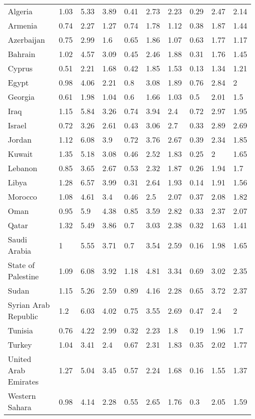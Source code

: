 \begin{longtable}[t]{llllllllll}
Algeria & 1.03 & 5.33 & 3.89 & 0.41 & 2.73 & 2.23 & 0.29 & 2.47 & 2.14\\
Armenia & 0.74 & 2.27 & 1.27 & 0.74 & 1.78 & 1.12 & 0.38 & 1.87 & 1.44\\
Azerbaijan & 0.75 & 2.99 & 1.6 & 0.65 & 1.86 & 1.07 & 0.63 & 1.77 & 1.17\\
Bahrain & 1.02 & 4.57 & 3.09 & 0.45 & 2.46 & 1.88 & 0.31 & 1.76 & 1.45\\
Cyprus & 0.51 & 2.21 & 1.68 & 0.42 & 1.85 & 1.53 & 0.13 & 1.34 & 1.21\\
Egypt & 0.98 & 4.06 & 2.21 & 0.8 & 3.08 & 1.89 & 0.76 & 2.84 & 2\\
Georgia & 0.61 & 1.98 & 1.04 & 0.6 & 1.66 & 1.03 & 0.5 & 2.01 & 1.5\\
Iraq & 1.15 & 5.84 & 3.26 & 0.74 & 3.94 & 2.4 & 0.72 & 2.97 & 1.95\\
Israel & 0.72 & 3.26 & 2.61 & 0.43 & 3.06 & 2.7 & 0.33 & 2.89 & 2.69\\
Jordan & 1.12 & 6.08 & 3.9 & 0.72 & 3.76 & 2.67 & 0.39 & 2.34 & 1.85\\
Kuwait & 1.35 & 5.18 & 3.08 & 0.46 & 2.52 & 1.83 & 0.25 & 2 & 1.65\\
Lebanon & 0.85 & 3.65 & 2.67 & 0.53 & 2.32 & 1.87 & 0.26 & 1.94 & 1.7\\
Libya & 1.28 & 6.57 & 3.99 & 0.31 & 2.64 & 1.93 & 0.14 & 1.91 & 1.56\\
Morocco & 1.08 & 4.61 & 3.4 & 0.46 & 2.5 & 2.07 & 0.37 & 2.08 & 1.82\\
Oman & 0.95 & 5.9 & 4.38 & 0.85 & 3.59 & 2.82 & 0.33 & 2.37 & 2.07\\
Qatar & 1.32 & 5.49 & 3.86 & 0.7 & 3.03 & 2.38 & 0.32 & 1.63 & 1.41\\
Saudi Arabia & 1 & 5.55 & 3.71 & 0.7 & 3.54 & 2.59 & 0.16 & 1.98 & 1.65\\
State of Palestine & 1.09 & 6.08 & 3.92 & 1.18 & 4.81 & 3.34 & 0.69 & 3.02 & 2.35\\
Sudan & 1.15 & 5.26 & 2.59 & 0.89 & 4.16 & 2.28 & 0.65 & 3.72 & 2.37\\
Syrian Arab Republic & 1.2 & 6.03 & 4.02 & 0.75 & 3.55 & 2.69 & 0.47 & 2.4 & 2\\
Tunisia & 0.76 & 4.22 & 2.99 & 0.32 & 2.23 & 1.8 & 0.19 & 1.96 & 1.7\\
Turkey & 1.04 & 3.41 & 2.4 & 0.67 & 2.31 & 1.83 & 0.35 & 2.02 & 1.77\\
United Arab Emirates & 1.27 & 5.04 & 3.45 & 0.57 & 2.24 & 1.68 & 0.16 & 1.55 & 1.37\\
Western Sahara & 0.98 & 4.14 & 2.28 & 0.55 & 2.65 & 1.76 & 0.3 & 2.05 & 1.59\\

\end{longtable}
